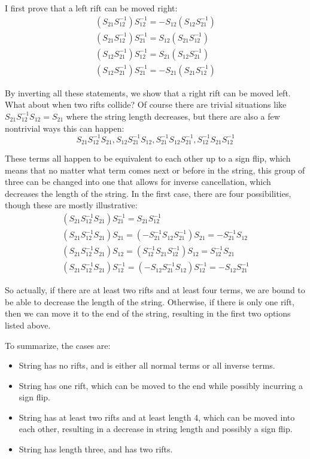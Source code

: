 \documentclass{article}
\begin{document}
I first prove that a left rift can be moved right:
\begin{gather*}
    \left(S_{21}S_{12}^{-1}\right)S_{12}^{-1} = -S_{12}\left(S_{12}S_{21}^{-1}\right)\\
    \left(S_{21}S_{12}^{-1}\right)S_{21}^{-1} = S_{12}\left(S_{21}S_{12}^{-1}\right)\\
    \left(S_{12}S_{21}^{-1}\right)S_{12}^{-1} = S_{21}\left(S_{12}S_{21}^{-1}\right)\\
    \left(S_{12}S_{21}^{-1}\right)S_{21}^{-1} = -S_{21}\left(S_{21}S_{12}^{-1}\right)
\end{gather*}

By inverting all these statements, we show that a right rift can be moved left. What about when two rifts collide? Of course there are trivial situations like $S_{21}S_{12}^{-1}S_{12}=S_{21}$ where the string length decreases, but there are also a few nontrivial ways this can happen:
\begin{equation*}
    S_{21}S_{12}^{-1}S_{21}, S_{12}S_{21}^{-1}S_{12}, S_{21}^{-1}S_{12}S_{21}^{-1}, S_{12}^{-1}S_{21}S_{12}^{-1}
\end{equation*}

These terms all happen to be equivalent to each other up to a sign flip, which means that no matter what term comes next or before in the string, this group of three can be changed into one that allows for inverse cancellation, which decreases the length of the string. In the first case, there are four possibilities, though these are mostly illustrative:
\begin{gather*}
    \left(S_{21}S_{12}^{-1}S_{21}\right)S_{21}^{-1} = S_{21}S_{12}^{-1}\\
    \left(S_{21}S_{12}^{-1}S_{21}\right)S_{21} = \left(-S_{21}^{-1}S_{12}S_{21}^{-1}\right)S_{21} = -S_{21}^{-1}S_{12}\\
    \left(S_{21}S_{12}^{-1}S_{21}\right)S_{12} = \left(S_{12}^{-1}S_{21}S_{12}^{-1}\right)S_{12} = S_{12}^{-1}S_{21}\\
    \left(S_{21}S_{12}^{-1}S_{21}\right)S_{12}^{-1} = \left(-S_{12}S_{21}^{-1}S_{12}\right)S_{12}^{-1} = -S_{12}S_{21}^{-1}
\end{gather*}

So actually, if there are at least two rifts and at least four terms, we are bound to be able to decrease the length of the string. Otherwise, if there is only one rift, then we can move it to the end of the string, resulting in the first two options listed above.

To summarize, the cases are:
\begin{itemize}
    \item String has no rifts, and is either all normal terms or all inverse terms.
    \item String has one rift, which can be moved to the end while possibly incurring a sign flip.
    \item String has at least two rifts and at least length 4, which can be moved into each other, resulting in a decrease in string length and possibly a sign flip.
    \item String has length three, and has two rifts.
\end{itemize}
\end{document}
